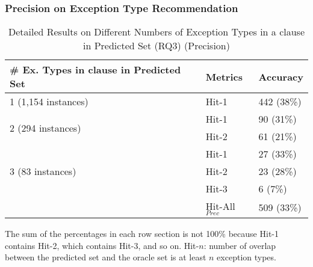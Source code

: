 
\subsubsection{{\bf Precision on Exception Type Recommendation}}
\label{sec:req3-precision}


\begin{table}[t]
  \caption{Detailed Results on Different Numbers of Exception Types in a  clause in Predicted Set (RQ3) (Precision)}
	\vspace{-12pt}
	{\small
	  \begin{center}
            \tabcolsep 2pt
			\renewcommand{\arraystretch}{1}
			\begin{tabular}{p{5cm}<{\centering}|p{1.4cm}<{\centering}|p{1.6cm}<{\centering}}
				\hline
				\# Ex. Types in \code{catch} clause in Predicted Set & Metrics & Accuracy \\
				\hline
				\multirow{1}{*}{1 (1,154 instances)}   & Hit-1  & 442 (38\%) \\
				\hline
				\multirow{2}{*}{2 (294 instances)}  & Hit-1   & 90 (31\%) \\
				& Hit-2       						& 61 (21\%) \\
				\hline
				\multirow{3}{*}{3 (83 instances)}  & Hit-1    & 27 (33\%) \\
				& Hit-2         					& 23 (28\%)\\
				& Hit-3         				  	& 6 (7\%) \\
                                \hline
                                & Hit-All$_{Prec}$ & 509 (33\%)\\
				\hline
			\end{tabular}
                        The sum of the percentages in each row section is not 100\% because Hit-1 contains Hit-2, which contains Hit-3, and so on. Hit-$n$: number of overlap between the predicted set and the oracle set is at least $n$ exception types.
			\label{tab:precision-3}
		\end{center}
	}
\end{table}


